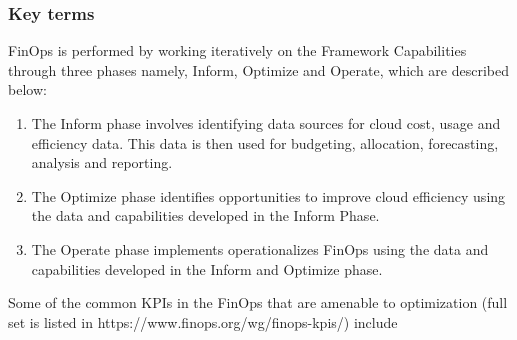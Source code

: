 \subsubsection{Key terms}
FinOps is performed by working iteratively on the Framework Capabilities through three phases \cite{finopsbenchkpis} namely, Inform, Optimize and Operate, which are described below:
\begin{enumerate}[labelwidth=*, labelindent=0pt, leftmargin=*, label=(\arabic*),itemsep=0mm]
\item The Inform phase involves identifying data sources for cloud cost, usage and efficiency data. This data is then used for budgeting, allocation, forecasting, analysis and reporting. 
\item The Optimize phase identifies opportunities to improve cloud efficiency using the data and capabilities developed in the Inform Phase.
\item The Operate phase implements operationalizes FinOps using the data and capabilities developed in the Inform and Optimize phase. 
\end{enumerate}
Some of the common KPIs in the FinOps that are amenable to optimization (full set is listed in https://www.finops.org/wg/finops-kpis/) include
